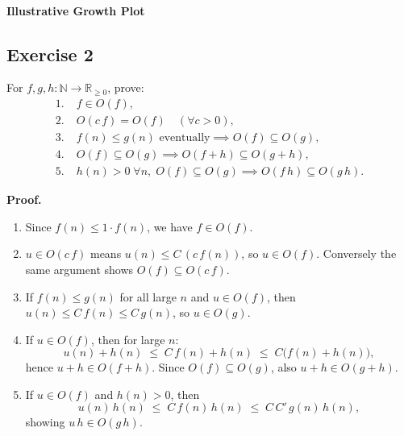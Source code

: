 \documentclass[12pt]{article}
\begin{document}
\paragraph{Illustrative Growth Plot}
\begin{center}
\end{center}

\subsection{Exercise 2}
For \(f,g,h\colon\mathbb N\to\mathbb R_{\ge0}\), prove:
\[
\begin{aligned}
1.\;&f\in O(f),\\
2.\;&O(c\,f)=O(f)\quad(\forall c>0),\\
3.\;&f(n)\le g(n)\text{ eventually}\implies O(f)\subseteq O(g),\\
4.\;&O(f)\subseteq O(g)\implies O(f+h)\subseteq O(g+h),\\
5.\;&h(n)>0\;\forall n,\;O(f)\subseteq O(g)\implies O(f\,h)\subseteq O(g\,h).
\end{aligned}
\]

\newpage

\textbf{Proof.}
\begin{enumerate}[label=\arabic*.]
  \item Since \(f(n)\le1\cdot f(n)\), we have \(f\in O(f)\).
  \item \(u\in O(c\,f)\) means \(u(n)\le C\,(c\,f(n))\), so \(u\in O(f)\).  Conversely the same argument shows \(O(f)\subseteq O(c\,f)\).  
  \item If \(f(n)\le g(n)\) for all large \(n\) and \(u\in O(f)\), then \(u(n)\le C\,f(n)\le C\,g(n)\), so \(u\in O(g)\).  
  \item If \(u\in O(f)\), then for large \(n\):
  \[
    u(n)+h(n)\;\le\;C\,f(n)+h(n)\;\le\;C\bigl(f(n)+h(n)\bigr),
  \]
  hence \(u+h\in O(f+h)\).  Since \(O(f)\subseteq O(g)\), also \(u+h\in O(g+h)\).  
  \item If \(u\in O(f)\) and \(h(n)>0\), then 
  \[
    u(n)\,h(n)\;\le\;C\,f(n)\,h(n)\;\le\;C\,C'\,g(n)\,h(n),
  \]
  showing \(u\,h\in O(g\,h)\).
\end{enumerate}
\end{document}
